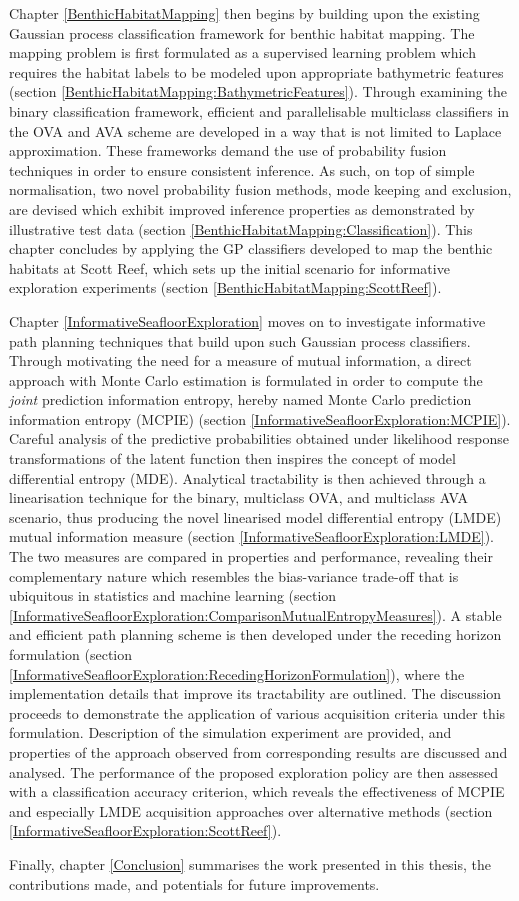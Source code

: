 		Chapter \ref{BenthicHabitatMapping} then begins by building upon the existing Gaussian process classification framework for benthic habitat mapping. The mapping problem is first formulated as a supervised learning problem which requires the habitat labels to be modeled upon appropriate bathymetric features (section \ref{BenthicHabitatMapping:BathymetricFeatures}). Through examining the binary classification framework, efficient and parallelisable multiclass classifiers in the OVA and AVA scheme are developed in a way that is not limited to Laplace approximation. These frameworks demand the use of probability fusion techniques in order to ensure consistent inference. As such, on top of simple normalisation, two novel probability fusion methods, mode keeping and exclusion, are devised which exhibit improved inference properties as demonstrated by illustrative test data (section \ref{BenthicHabitatMapping:Classification}). This chapter concludes by applying the GP classifiers developed to map the benthic habitats at Scott Reef, which sets up the initial scenario for informative exploration experiments (section \ref{BenthicHabitatMapping:ScottReef}).
		
		Chapter \ref{InformativeSeafloorExploration} moves on to investigate informative path planning techniques that build upon such Gaussian process classifiers. Through motivating the need for a measure of mutual information, a direct approach with Monte Carlo estimation is formulated in order to compute the \textit{joint} prediction information entropy, hereby named Monte Carlo prediction information entropy (MCPIE) (section \ref{InformativeSeafloorExploration:MCPIE}). Careful analysis of the predictive probabilities obtained under likelihood response transformations of the latent function then inspires the concept of model differential entropy (MDE). Analytical tractability is then achieved through a linearisation technique for the binary, multiclass OVA, and multiclass AVA scenario, thus producing the novel linearised model differential entropy (LMDE) mutual information measure (section \ref{InformativeSeafloorExploration:LMDE}). The two measures are compared in properties and performance, revealing their complementary nature which resembles the bias-variance trade-off that is ubiquitous in statistics and machine learning (section \ref{InformativeSeafloorExploration:ComparisonMutualEntropyMeasures}). A stable and efficient path planning scheme is then developed under the receding horizon formulation (section \ref{InformativeSeafloorExploration:RecedingHorizonFormulation}), where the implementation details that improve its tractability are outlined. The discussion proceeds to demonstrate the application of various acquisition criteria under this formulation. Description of the simulation experiment are provided, and properties of the approach observed from corresponding results are discussed and analysed. The performance of the proposed exploration policy are then assessed with a classification accuracy criterion, which reveals the effectiveness of MCPIE and especially LMDE acquisition approaches over alternative methods (section \ref{InformativeSeafloorExploration:ScottReef}).
				
		Finally, chapter \ref{Conclusion} summarises the work presented in this thesis, the contributions made, and potentials for future improvements.